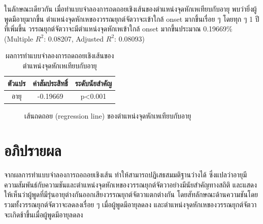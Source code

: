 \documentclass[a4paper]{article}
\begin{document}
    ในลักษณะเดียวกัน เมื่อทำแบบจําลองการถดถอยเชิงเส้นของตำแหน่งจุดหักเหเทียบกับอายุ พบว่ายิ่งผู้พูดมีอายุมากขึ้น ตำแหน่งจุดหักเหของวรรณยุกต์จัตวาจะเข้าใกล้ onset มากขึ้นเรื่อย ๆ โดยทุก ๆ 1 ปีที่เพิ่มขึ้น วรรณยุกต์จัตวาจะมีตำแหน่งจุดหักเหเข้าใกล้ onset มากขึ้นประมาณ 0.19669\% (Multiple $R^2$: 0.08207, Adjusted $R^2$: 0.08093)
    \begin{table}[!ht]
        \begin{center}
        \begin{tabular}{|c|c|c|}
            \hline
            \textbf{ตัวแปร} & \textbf{ค่าสัมประสิทธิ์} & \textbf{ระดับนัยสำคัญ} \\
            \hline
            อายุ & -0.19669 & p<0.001 \\
            \hline
        \end{tabular}
        \end{center}
        \caption{ผลการทำแบบจำลองการถดถอยเชิงเส้นของตำแหน่งจุดหักเหเทียบกับอายุ}
    \end{table}
    \begin{figure}[!ht]
        \begin{center}
        \end{center}
        \caption{เส้นถดถอย (regression line) ของตำแหน่งจุดหักเหเทียบกับอายุ}
    \end{figure}
    \newpage
\section{อภิปรายผล}
    จากผลการทำแบบจำลองการถอถอยเชิงเส้น ทำให้สามารถปฏิเสธสมมติฐานว่างได้ ซึ่งแปลว่าอายุมีความสัมพันธ์กับความชันและตำแหน่งจุดหักเหของวรรณยุกต์จัตวาอย่างมีนัยสำคัญทางสถิติ และแสดงให้เห็นว่าผู้พูดที่มีรุ่นอายุต่างกันออกเสียงวรรณยุกต์จัตวาแตกต่างกัน โดยสัทลักษณะด้านความชันโดยรวมทั้งวรรณยุกต์จัตวาจะลดลงเรื่อย ๆ เมื่อผู้พูดมีอายุลดลง และตำแหน่งจุดหักเหของวรรณยุกต์จัตวาจะเกิดช้าขึ้นเมื่อผู้พูดมีอายุลดลง
\end{document}
